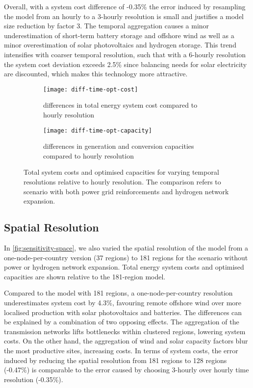 Overall, with a system cost difference of -0.35\% the error induced by
resampling the model from an hourly to a 3-hourly resolution is small and
justifies a model size reduction by factor 3. The temporal aggregation causes a
minor underestimation of short-term battery storage and offshore wind as well as
a minor overestimation of solar photovoltaics and hydrogen storage. This trend
intensifies with coarser temporal resolution, such that with a 6-hourly
resolution the system cost deviation exceeds 2.5\% since balancing needs for
solar electricity are discounted, which makes this technology more attractive.

\begin{figure}
    \centering
    \begin{subfigure}[t]{\textwidth}
        \centering
        \caption{differences in total energy system cost compared to hourly resolution}
        \texttt{[image: diff-time-opt-cost]}
        \label{fig:sensitivity-time-cost}
    \end{subfigure}
    \begin{subfigure}[t]{\textwidth}
        \centering
        \caption{differences in generation and conversion capacities compared to hourly resolution}
        \texttt{[image: diff-time-opt-capacity]}
        \label{fig:sensitivity-time-cap}
    \end{subfigure}
    \caption{ Total system costs and optimised capacities for varying temporal
    resolutions relative to hourly resolution. The comparison refers to scenario
    with both power grid reinforcements and hydrogen network expansion. }
    \label{fig:sensitivity-time}
\end{figure}

\subsection{Spatial Resolution}
\label{sec:si:sensitivity-space}

In \cref{fig:sensitivity-space}, we also varied the spatial resolution of the
model from a one-node-per-country version (37 regions) to 181 regions for the
scenario without power or hydrogen network expansion. Total energy system
costs and optimised capacities are shown relative to the 181-region model.

Compared to the model with 181 regions, a one-node-per-country resolution
underestimates system cost by 4.3\%, favouring remote offshore wind over more
localised production with solar photovoltaics and batteries. The differences can
be explained by a combination of two opposing
effects. The aggregation of the transmission
networks lifts bottlenecks within clustered regions, lowering system costs. On
the other hand, the aggregation of wind and solar capacity factors blur the most
productive sites, increasing costs. In terms of system costs, the error induced
by reducing the spatial resolution from 181 regions to 128 regions (-0.47\%) is
comparable to the error caused by choosing 3-hourly over hourly time resolution
(-0.35\%).

